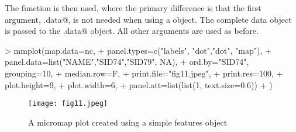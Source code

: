 \documentclass{article}
\begin{document}
The \verb@mmplot@ function is then used, where the primary difference is that the first argument, \verb@stat.data@, is not needed when using a \verb@sf@ object.  The complete \verb@nc@ data object is passed to the \verb@map.data@ object.  All other arguments are used as before.  

\begin{Schunk}
\begin{Sinput}
> mmplot(map.data=nc,
+        panel.types=c("labels", "dot","dot", "map"),
+        panel.data=list("NAME","SID74","SID79", NA),
+        ord.by="SID74", grouping=10,
+        median.row=F,
+        print.file="fig11.jpeg",
+        print.res=100, 
+        plot.height=9, 
+        plot.width=6, 
+        panel.att=list(list(1, text.size=0.6))
+ ) 
\end{Sinput}
\end{Schunk}
\begin{figure}[!tbp] 
\begin{center} 
\texttt{[image: fig11.jpeg]}
  \caption{A micromap plot created using a simple features object}
  \label{fig11} 
\end{center} 
\end{figure}
\end{document}
